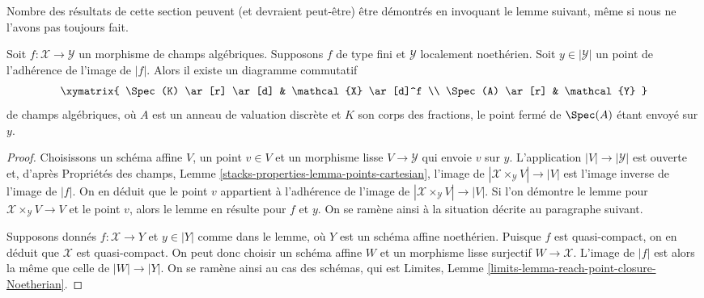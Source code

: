 \medskip\noindent
Nombre des résultats de cette section peuvent (et devraient peut-être)
être démontrés en invoquant le lemme suivant, même si nous ne l'avons pas
toujours fait.

\begin{lemma}
\label{lemma-reach-point-closure-Noetherian}
Soit $f : \mathcal{X} \to \mathcal{Y}$ un morphisme de champs algébriques.
Supposons $f$ de type fini et $\mathcal{Y}$ localement noethérien.
Soit $y \in |\mathcal{Y}|$ un point de l'adhérence de l'image de $|f|$.
Alors il existe un diagramme commutatif
$$
\xymatrix{
\Spec(K) \ar[r] \ar[d] & \mathcal{X} \ar[d]^f \\
\Spec(A) \ar[r] & \mathcal{Y}
}
$$
de champs algébriques, où $A$ est un anneau de valuation discrète et $K$
son corps des fractions, le point fermé de $\Spec(A)$ étant envoyé sur $y$.
\end{lemma}

\begin{proof}
Choisissons un schéma affine $V$, un point $v \in V$ et un morphisme lisse
$V \to \mathcal{Y}$ qui envoie $v$ sur $y$. L'application $|V| \to |\mathcal{Y}|$
est ouverte et, d'après
Propriétés des champs, Lemme \ref{stacks-properties-lemma-points-cartesian},
l'image de $|\mathcal{X} \times_\mathcal{Y} V| \to |V|$
est l'image inverse de l'image de $|f|$.
On en déduit que le point $v$ appartient à l'adhérence de
l'image de $|\mathcal{X} \times_\mathcal{Y} V| \to |V|$.
Si l'on démontre le lemme pour
$\mathcal{X} \times_\mathcal{Y} V \to V$ et le point $v$, alors
le lemme en résulte pour $f$ et $y$.
On se ramène ainsi à la situation décrite au
paragraphe suivant.

\medskip\noindent
Supposons donnés $f : \mathcal{X} \to Y$ et $y \in |Y|$ comme dans le lemme, où
$Y$ est un schéma affine noethérien. Puisque $f$ est quasi-compact, on en déduit que
$\mathcal{X}$ est quasi-compact. On peut donc choisir un schéma affine $W$ et
un morphisme lisse surjectif $W \to \mathcal{X}$. L'image de
$|f|$ est alors la même que celle de $|W| \to |Y|$. On se ramène ainsi
au cas des schémas, qui est
Limites, Lemme \ref{limits-lemma-reach-point-closure-Noetherian}.
\end{proof}

